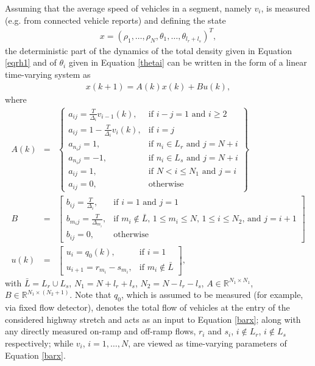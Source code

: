 \documentclass[titlepage,oneside,fleqn,12pt]{article}
\begin{document}
Assuming that the average speed of vehicles in a segment, namely $v_i$, is measured (e.g. from connected vehicle reports) and defining the state
\begin{eqnarray}
{x}=\left(\rho_1,\ldots,\rho_N,\theta_1,\ldots,\theta_{l_r+l_s}\right)^T, \label{stnew}
\end{eqnarray}
the deterministic part of the dynamics of the total density given in Equation \ref{eqrh1} and of $\theta_i$ given in Equation \ref{thetai} can be written in the form of a linear time-varying system as
\begin{eqnarray}
{x}(k+1)={A}(k){x}(k)+{B}{u}(k),\label{barx}
\end{eqnarray}
where
\begin{eqnarray}
{A}(k)&=&\left\{\begin{array}{lll}{a}_{ij}=\frac{T}{\Delta_i}v_{i-1}(k),&\mbox{if $i-j=1$ and $i\geq2$}\\{a}_{ij}=1-\frac{T}{\Delta_i}v_i(k),&\mbox{if $i=j$}\\{a}_{n_ij}=1,&\mbox{if $n_i\in L_r$ and $j=N+i$}\\{a}_{n_ij}=-1,&\mbox{if $n_i\in L_s$ and $j=N+i$}\\{a}_{ij}=1,&\mbox{if $N< i\leq N_1$ and $j=i$}\\{a}_{ij}=0,&\mbox{otherwise}\end{array}\right\}\label{adef1}\\
{B}\!&=&\!\left[\begin{array}{ll}{b}_{ij}=\frac{T}{\Delta_i},&\mbox{if $i=1$ and $j=1$}\\{b}_{m_ij}=\frac{T}{\Delta_{m_i}},&\mbox{if $m_i\notin \bar{L}$, $1\leq m_i\leq N$, $1\leq i\leq N_2$, and $j=i+1$}\\{b}_{ij}=0,&\mbox{otherwise}\end{array}\!\!\right]\label{defbu}\\
{u}(k)&=&\left[\begin{array}{ll}{u}_i=q_0(k),&\mbox{if $i=1$}\\{u}_{i+1}=r_{m_i}-s_{m_{i}},&\mbox{if $m_i\notin \bar{L}$}\end{array}\right],\label{newu}
\end{eqnarray}
with $\bar{L}=L_r\cup L_s$, $N_1=N+l_r+l_s$, $N_2=N-l_r-l_s$, ${A}\in\mathbb{R}^{N_1\times N_1}$, ${B}\in\mathbb{R}^{N_1\times (N_2+1)}$. Note that $q_0$, which is assumed to be measured (for example, via fixed flow detector), denotes the total flow of vehicles at the entry of the considered highway stretch and acts as an input to Equation \ref{barx}; along with any directly measured on-ramp and off-ramp flows, $r_i$ and $s_i$, $i \notin L_r$, $i \notin L_s$ respectively; while $v_i$, $i=1,\ldots,N$, are viewed as time-varying parameters of Equation \ref{barx}.
\end{document}
